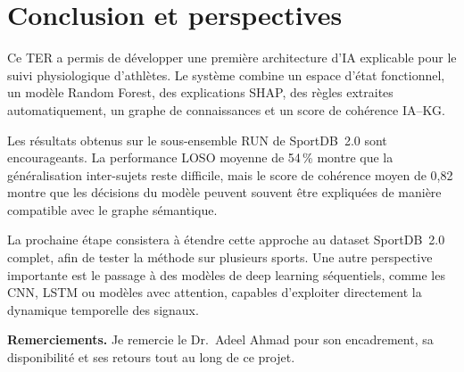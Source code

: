 \documentclass[12pt,a4paper]{article}
\begin{document}
\section{Conclusion et perspectives}
\label{sec:conclusion}


Ce TER a permis de développer une première architecture d'IA explicable pour
le suivi physiologique d'athlètes. Le système combine un espace d'état
fonctionnel, un modèle Random Forest, des explications SHAP, des règles
extraites automatiquement, un graphe de connaissances et un score de
cohérence IA--KG.

Les résultats obtenus sur le sous-ensemble RUN de SportDB~2.0 sont
encourageants. La performance LOSO moyenne de 54\,\% montre que la
généralisation inter-sujets reste difficile, mais le score de cohérence
moyen de 0,82 montre que les décisions du modèle peuvent souvent être
expliquées de manière compatible avec le graphe sémantique.

La prochaine étape consistera à étendre cette approche au dataset SportDB~2.0
complet, afin de tester la méthode sur plusieurs sports. Une autre
perspective importante est le passage à des modèles de deep learning
séquentiels, comme les CNN, LSTM ou modèles avec attention, capables
d'exploiter directement la dynamique temporelle des signaux.

\bigskip
\noindent\textbf{Remerciements.} Je remercie le Dr.~Adeel Ahmad pour son
encadrement, sa disponibilité et ses retours tout au long de ce projet.
\end{document}
